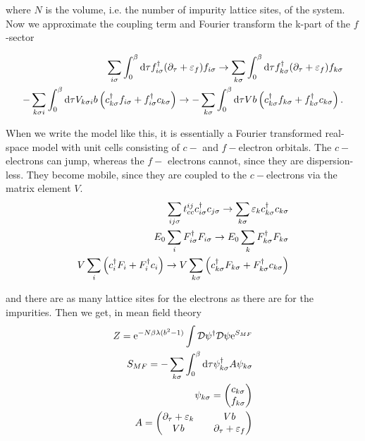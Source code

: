 where $N$ is the volume, i.e. the number of impurity lattice sites, of the system. Now we approximate the coupling term and Fourier transform the k-part of the $f$-sector 

\begin{align*}
    \sum_{i\sigma} \int_{0}^{\beta} \dd \tau f^{\dagger}_{i\sigma}(\partial_\tau + \varepsilon_f)f_{i\sigma} \to \sum_{k\sigma} \int_{0}^{\beta} \dd \tau f^{\dagger}_{k\sigma}(\partial_\tau + \varepsilon_f)f_{k\sigma} \\
    - \sum_{k\sigma i} \int_{0}^{\beta} \dd \tau V_{k\sigma i}b\left( c^{\dagger}_{k\sigma}f_{i\sigma} + f^{\dagger}_{i\sigma}c_{k\sigma}\right) \to - \sum_{k\sigma} \int_{0}^{\beta} \dd \tau Vb\left( c^{\dagger}_{k\sigma}f_{k\sigma} + f^{\dagger}_{k\sigma}c_{k\sigma}\right). 
\end{align*}

When we write the model like this, it is essentially a Fourier transformed real-space model with unit cells consisting of $c-$ and $f-$electron orbitals. The $c-$electrons can jump, whereas the $f-$ electrons cannot, since they are dispersion-less. They become mobile, since they are coupled to the $c-$electrons via the matrix element $V$. 
\begin{align*}
    \sum_{ij\sigma} t_{cc}^{ij} c^{\dagger}_{i\sigma} c_{j\sigma} \to \sum_{k\sigma} \varepsilon_k c^{\dagger}_{k\sigma} c_{k\sigma} \\ 
    E_0 \sum_i F^{\dagger}_{i\sigma} F_{i\sigma} \to E_0 \sum_k F^{\dagger}_{k\sigma} F_{k\sigma} \\
    V \sum_i \left( c^{\dagger}_i F_i + F^{\dagger}_i c_i \right) \to V\sum_{k\sigma} \left( c^{\dagger}_{k\sigma} F_{k\sigma} + F^{\dagger}_{k\sigma} c_{k\sigma} \right)
\end{align*}

and there are as many lattice sites for the electrons as there are for the impurities. Then we get, in mean field theory \\

\begin{align*}
    Z = \mathrm{e}^{-N\beta \lambda (b^2 - 1)} \int \mathcal{D} \psi^\dagger \mathcal{D} \psi \mathrm{e}^{S_{MF}} \\ 
    S_{MF} = -\sum_{k\sigma} \int_{0}^{\beta} \dd \tau \psi^\dagger_{k\sigma}A\psi_{k\sigma} \\ 
    \psi_{k\sigma} = \begin{pmatrix} c_{k\sigma} \\ f_{k\sigma} \end{pmatrix} \\
    A = \begin{pmatrix} \partial_\tau + \varepsilon_k && Vb \\
    Vb && \partial_\tau + \varepsilon_f \end{pmatrix} 
\end{align*}

